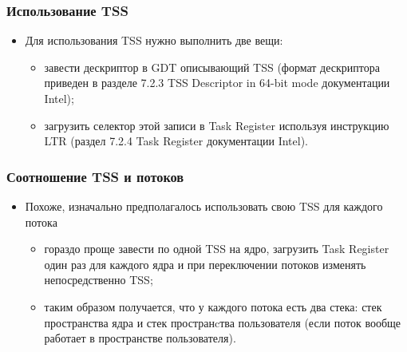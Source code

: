 \begin{frame}
\frametitle{Использование TSS}
\begin{itemize}
  \item Для использования TSS нужно выполнить две вещи:
  \begin{itemize}
    \item завести дескриптор в GDT описывающий TSS (формат дескриптора приведен
    в разделе 7.2.3 TSS Descriptor in 64-bit mode документации Intel);
    \item загрузить селектор этой записи в Task Register используя инструкцию
    LTR (раздел 7.2.4 Task Register документации Intel).
  \end{itemize}
\end{itemize}
\end{frame}

\begin{frame}
\frametitle{Соотношение TSS и потоков}
\begin{itemize}
  \item Похоже, изначально предполагалось использовать свою TSS для каждого
  потока
  \begin{itemize}
    \item гораздо проще завести по одной TSS на ядро, загрузить Task Register
    один раз для каждого ядра и при переключении потоков изменять
    непосредственно TSS;
    \item таким образом получается, что у каждого потока есть два стека: стек
    пространства ядра и стек пространcтва пользователя (если поток вообще
    работает в пространстве пользователя).
  \end{itemize}
\end{itemize}
\end{frame}
